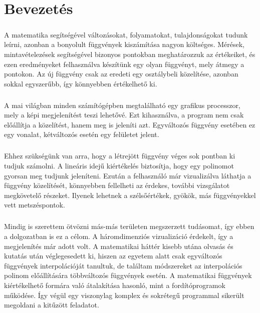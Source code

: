 \documentclass[12pt]{report}
\begin{document}
\tableofcontents

\chapter{Bevezetés}
\paragraph{}
A matematika segítségével változásokat, folyamatokat, tulajdonságokat tudunk leírni, azonban a bonyolult függvények kiszámítása nagyon költséges. Mérések, mintavételezések segítségével bizonyos pontokban meghatározzuk az értékeiket, és ezen eredményeket felhasználva készítünk egy olyan függvényt, mely átmegy a pontokon. Az új függvény csak az eredeti egy osztálybeli közelítése, azonban sokkal egyszerűbb, így könnyebben értékelhető ki.
\paragraph{}
A mai világban minden számítógépben megtalálható egy grafikus processzor, mely a képi megjelenítést teszi lehetővé. Ezt kihasználva, a program nem csak előállítja a közelítést, hanem meg is jeleníti azt. Egyváltozós  függvény esetében ez egy vonalat, kétváltozós esetén egy felületet jelent.
\paragraph{}
Ehhez szükségünk van arra, hogy a létrejött függvény véges sok pontban ki tudjuk számolni. A lineáris idejű kiértékelés biztosítja, hogy egy polinomot gyorsan meg tudjunk jeleníteni. Ezután a felhasználó már vizualizálva láthatja a függvény közelítését, könnyebben fellelheti az érdekes, további vizsgálatot megkövetelő részeket. Ilyenek lehetnek a szélsőértékek, gyökök, más függvényekkel vett metszéspontok.
\paragraph{}
Mindig is szerettem ötvözni más-más területen megszerzett tudásomat, így ebben a dolgozatban is ez a célom. A háromdimenziós vizualizáció érdekelt, így a megjelenítés már adott volt. A matematikai háttér kisebb utána olvasás és kutatás után véglegesedett ki, hiszen az egyetem alatt csak egyváltozós függvények interpolációját tanultuk, de találtam módszereket az interpolációs polinom előállítására többváltozós függvények esetén. A matematikai függvények kiértékelhető formára való átalakítása hasonló, mint a fordítóprogramok működése. Így végül egy viszonylag komplex és sokrétegű programmal sikerült megoldani a kitűzött feladatot.
\end{document}
